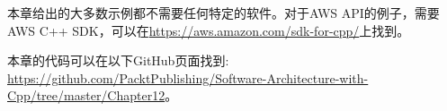 本章给出的大多数示例都不需要任何特定的软件。对于AWS API的例子，需要AWS C++ SDK，可以在\url{https://aws.amazon.com/sdk-for-cpp/}上找到。

本章的代码可以在以下GitHub页面找到: \url{https://github.com/PacktPublishing/Software-Architecture-with-Cpp/tree/master/Chapter12}。